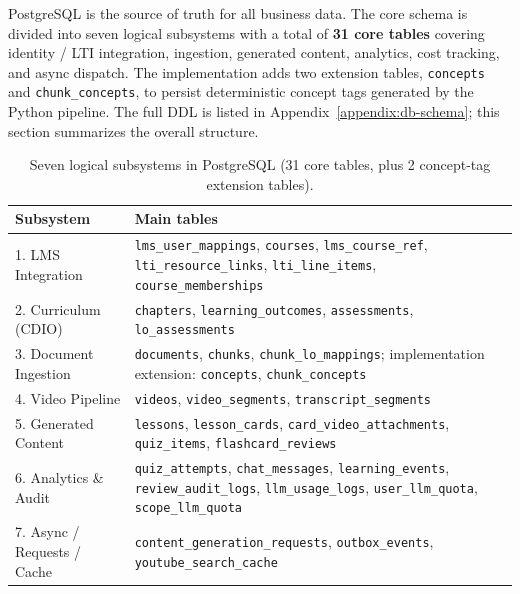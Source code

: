 PostgreSQL is the source of truth for all business data. The core schema
is divided into seven logical subsystems with a total of \textbf{31 core
tables} covering identity / LTI integration, ingestion, generated
content, analytics, cost tracking, and async dispatch. The implementation
adds two extension tables, \texttt{concepts} and
\texttt{chunk\_concepts}, to persist deterministic concept tags generated
by the Python pipeline. The full DDL is listed in
Appendix~\ref{appendix:db-schema}; this section summarizes the overall
structure.

\begin{table}[H]
    \centering
    \caption{Seven logical subsystems in PostgreSQL (31 core tables, plus 2 concept-tag extension tables).}
    \label{tab:postgres-tables}
    \begin{tabular}{|p{4cm}|p{9.5cm}|}
        \hline
        \textbf{Subsystem} & \textbf{Main tables} \\
        \hline
        1. LMS Integration
            & \texttt{lms\_user\_mappings}, \texttt{courses},
              \texttt{lms\_course\_ref}, \texttt{lti\_resource\_links},
              \texttt{lti\_line\_items}, \texttt{course\_memberships} \\
        \hline
        2. Curriculum (CDIO)
            & \texttt{chapters}, \texttt{learning\_outcomes},
              \texttt{assessments}, \texttt{lo\_assessments} \\
        \hline
        3. Document Ingestion
            & \texttt{documents}, \texttt{chunks},
              \texttt{chunk\_lo\_mappings}; implementation extension:
              \texttt{concepts}, \texttt{chunk\_concepts} \\
        \hline
        4. Video Pipeline
            & \texttt{videos}, \texttt{video\_segments},
              \texttt{transcript\_segments} \\
        \hline
        5. Generated Content
            & \texttt{lessons}, \texttt{lesson\_cards},
              \texttt{card\_video\_attachments}, \texttt{quiz\_items},
              \texttt{flashcard\_reviews} \\
        \hline
        6. Analytics \& Audit
            & \texttt{quiz\_attempts}, \texttt{chat\_messages},
              \texttt{learning\_events}, \texttt{review\_audit\_logs},
              \texttt{llm\_usage\_logs}, \texttt{user\_llm\_quota},
              \texttt{scope\_llm\_quota} \\
        \hline
        7. Async / Requests / Cache
            & \texttt{content\_generation\_requests},
              \texttt{outbox\_events}, \texttt{youtube\_search\_cache} \\
        \hline
    \end{tabular}
\end{table}

